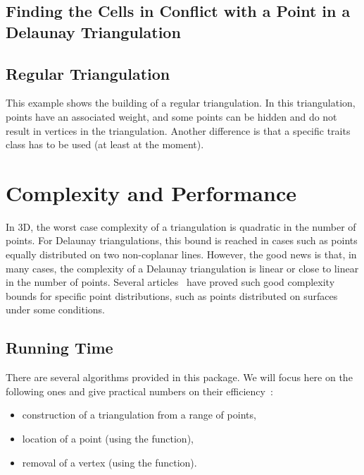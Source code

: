 
\subsection{Finding the Cells in Conflict with a Point in a Delaunay
Triangulation}


\subsection{Regular Triangulation}
This example shows the building of a regular triangulation.  In this
triangulation, points have an associated weight, and some points can
be hidden and do not result in vertices in the triangulation.
Another difference is that a specific traits class has to be used
(at least at the moment).


\section{Complexity and Performance\label{Triangulation3-sec-complexity}}

In 3D, the worst case complexity of a triangulation is quadratic in the number
of points.  For Delaunay triangulations, this bound is reached in cases such as
points equally distributed on two non-coplanar lines.  However, the good news
is that, in many cases, the complexity of a Delaunay triangulation is linear or
close to linear in the number of points.  Several
articles~\cite{d-hdvdl-89,e-dpssdt-02,geometrica-5986i,prisme-4453a,prisme-abl-03}
have proved such good complexity bounds for specific point distributions, such
as points distributed on surfaces under some conditions.

\subsection{Running Time}

There are several algorithms provided in this package.  We will focus here on
the following ones and give practical numbers on their efficiency~:
\begin{itemize}
\item construction of a triangulation from a range of points, 
\item location of a point (using the  function),
\item removal of a vertex (using the  function).
\end{itemize}

